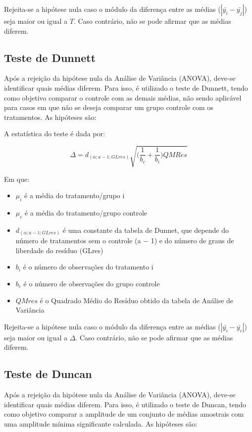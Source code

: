 \documentclass[
]{estat/estat}
\begin{document}
Rejeita-se a hipótese nula caso o módulo da diferença entre as médias
(\(|\bar{y_i} - \bar{y_j}|\)) seja maior ou igual a \(T\). Caso
contrário, não se pode afirmar que as médias diferem.

\subsection{Teste de Dunnett}\label{teste-de-dunnett}

Após a rejeição da hipótese nula da Análise de Variância (ANOVA),
deve-se identificar quais médias diferem. Para isso, é utilizado o teste
de Dunnett, tendo como objetivo comparar o controle com as demais
médias, não sendo aplicável para casos em que não se deseja comparar um
grupo controle com os tratamentos. As hipóteses são:


A estatística do teste é dada por:

\[\Delta = d_{(\alpha;a-1;GLres)} \sqrt{\Big( \frac{1}{b_c} + \frac{1}{b_i} \Big) QMRes}\]

Em que:

\begin{itemize}
\item
  \(\mu_i\) é a média do tratamento/grupo i
\item
  \(\mu_c\) é a média do tratamento/grupo controle
\item
  \(d_{(\alpha;a-1;GLres)}\) é uma constante da tabela de Dunnet, que
  depende do número de tratamentos sem o controle (a − 1) e do número de
  graus de liberdade do resíduo (GLres)
\item
  \(b_i\) é o número de observações do tratamento i
\item
  \(b_c\) é o número de observações do grupo controle
\item
  \(QMres\) é o Quadrado Médio do Resíduo obtido da tabela de Análise de
  Variância
\end{itemize}

Rejeita-se a hipótese nula caso o módulo da diferença entre as médias
(\(|\bar{y_i} - \bar{y_c}|\)) seja maior ou igual a \(\Delta\). Caso
contrário, não se pode afirmar que as médias diferem.

\subsection{Teste de Duncan}\label{teste-de-duncan}

Após a rejeição da hipótese nula da Análise de Variância (ANOVA),
deve-se identificar quais médias diferem. Para isso, é utilizado o teste
de Duncan, tendo como objetivo comparar a amplitude de um conjunto de
médias amostrais com uma amplitude mínima significante calculada. As
hipóteses são:
\end{document}
